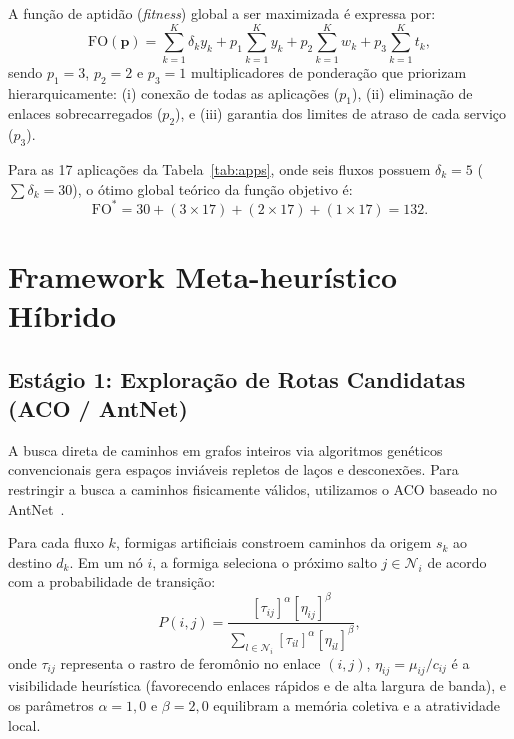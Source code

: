 \documentclass[journal]{IEEEtran}
\newcommand{\FO}{\mathrm{FO}}
\begin{document}
A fun\c{c}\~{a}o de aptid\~{a}o (\emph{fitness}) global a ser maximizada \'{e} expressa por:
\begin{equation}
\FO(\mathbf{p}) = \sum_{k=1}^K \delta_k y_k + p_1 \sum_{k=1}^K y_k + p_2 \sum_{k=1}^K w_k + p_3 \sum_{k=1}^K t_k,
\label{eq:fitness}
\end{equation}
sendo $p_1 = 3$, $p_2 = 2$ e $p_3 = 1$ multiplicadores de pondera\c{c}\~{a}o que priorizam hierarquicamente: (i) conex\~{a}o de todas as aplica\c{c}\~{o}es ($p_1$), (ii) elimina\c{c}\~{a}o de enlaces sobrecarregados ($p_2$), e (iii) garantia dos limites de atraso de cada servi\c{c}o ($p_3$).

Para as 17 aplica\c{c}\~{o}es da Tabela~\ref{tab:apps}, onde seis fluxos possuem $\delta_k = 5$ ($\sum \delta_k = 30$), o \'{o}timo global te\'{o}rico da fun\c{c}\~{a}o objetivo \'{e}:
\begin{equation}
\FO^* = 30 + (3 \times 17) + (2 \times 17) + (1 \times 17) = 132.
\end{equation}

\section{Framework Meta-heur\'{i}stico H\'{i}brido}
\label{sec:metodologia}

\subsection{Est\'{a}gio 1: Explora\c{c}\~{a}o de Rotas Candidatas (ACO / AntNet)}
A busca direta de caminhos em grafos inteiros via algoritmos gen\'{e}ticos convencionais gera espa\c{c}os invi\'{a}veis repletos de la\c{c}os e desconex\~{o}es. Para restringir a busca a caminhos fisicamente v\'{a}lidos, utilizamos o ACO baseado no AntNet~\cite{dicaro1998antnet}.

Para cada fluxo $k$, formigas artificiais constroem caminhos da origem $s_k$ ao destino $d_k$. Em um n\'{o} $i$, a formiga seleciona o pr\'{o}ximo salto $j \in \mathcal{N}_i$ de acordo com a probabilidade de transi\c{c}\~{a}o:
\begin{equation}
P(i, j) = \frac{[\tau_{ij}]^\alpha [\eta_{ij}]^\beta}{\sum_{l \in \mathcal{N}_i} [\tau_{il}]^\alpha [\eta_{il}]^\beta},
\label{eq:aco_prob}
\end{equation}
onde $\tau_{ij}$ representa o rastro de ferom\^{o}nio no enlace $(i, j)$, $\eta_{ij} = \mu_{ij} / c_{ij}$ \'{e} a visibilidade heur\'{i}stica (favorecendo enlaces r\'{a}pidos e de alta largura de banda), e os par\^{a}metros $\alpha = 1,0$ e $\beta = 2,0$ equilibram a mem\'{o}ria coletiva e a atratividade local.
\end{document}
